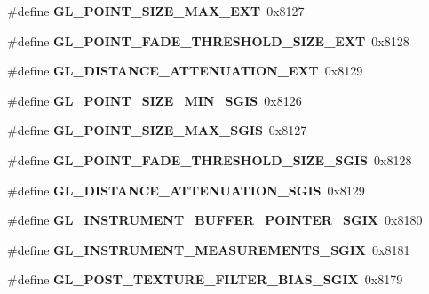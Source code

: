 \begin{DoxyCompactItemize}
\item 
\#define {\bfseries G\+L\+\_\+\+P\+O\+I\+N\+T\+\_\+\+S\+I\+Z\+E\+\_\+\+M\+A\+X\+\_\+\+E\+X\+T}~0x8127\label{_s_d_l__opengl_8h_a8436839348d23154e3869c6aeffbc7af}

\item 
\#define {\bfseries G\+L\+\_\+\+P\+O\+I\+N\+T\+\_\+\+F\+A\+D\+E\+\_\+\+T\+H\+R\+E\+S\+H\+O\+L\+D\+\_\+\+S\+I\+Z\+E\+\_\+\+E\+X\+T}~0x8128\label{_s_d_l__opengl_8h_a20802b84f5a710f59572b85b834d7e06}

\item 
\#define {\bfseries G\+L\+\_\+\+D\+I\+S\+T\+A\+N\+C\+E\+\_\+\+A\+T\+T\+E\+N\+U\+A\+T\+I\+O\+N\+\_\+\+E\+X\+T}~0x8129\label{_s_d_l__opengl_8h_ab4f79e552bfa98366ff4977cbc9304a4}

\item 
\#define {\bfseries G\+L\+\_\+\+P\+O\+I\+N\+T\+\_\+\+S\+I\+Z\+E\+\_\+\+M\+I\+N\+\_\+\+S\+G\+I\+S}~0x8126\label{_s_d_l__opengl_8h_a168c6e44294003b78965a6f0b9417d69}

\item 
\#define {\bfseries G\+L\+\_\+\+P\+O\+I\+N\+T\+\_\+\+S\+I\+Z\+E\+\_\+\+M\+A\+X\+\_\+\+S\+G\+I\+S}~0x8127\label{_s_d_l__opengl_8h_a15487da0f06c6715e5b98a1341ae0ce0}

\item 
\#define {\bfseries G\+L\+\_\+\+P\+O\+I\+N\+T\+\_\+\+F\+A\+D\+E\+\_\+\+T\+H\+R\+E\+S\+H\+O\+L\+D\+\_\+\+S\+I\+Z\+E\+\_\+\+S\+G\+I\+S}~0x8128\label{_s_d_l__opengl_8h_a06ce158d471f57cd4a86b08f6b54d8b1}

\item 
\#define {\bfseries G\+L\+\_\+\+D\+I\+S\+T\+A\+N\+C\+E\+\_\+\+A\+T\+T\+E\+N\+U\+A\+T\+I\+O\+N\+\_\+\+S\+G\+I\+S}~0x8129\label{_s_d_l__opengl_8h_a019f70d7665ba490146d48ea2c72e86b}

\item 
\#define {\bfseries G\+L\+\_\+\+I\+N\+S\+T\+R\+U\+M\+E\+N\+T\+\_\+\+B\+U\+F\+F\+E\+R\+\_\+\+P\+O\+I\+N\+T\+E\+R\+\_\+\+S\+G\+I\+X}~0x8180\label{_s_d_l__opengl_8h_a78948be95eb3e5d4e27413bea2dcf223}

\item 
\#define {\bfseries G\+L\+\_\+\+I\+N\+S\+T\+R\+U\+M\+E\+N\+T\+\_\+\+M\+E\+A\+S\+U\+R\+E\+M\+E\+N\+T\+S\+\_\+\+S\+G\+I\+X}~0x8181\label{_s_d_l__opengl_8h_a2f757e20804286a64aa6e5da4d2f6ec3}

\item 
\#define {\bfseries G\+L\+\_\+\+P\+O\+S\+T\+\_\+\+T\+E\+X\+T\+U\+R\+E\+\_\+\+F\+I\+L\+T\+E\+R\+\_\+\+B\+I\+A\+S\+\_\+\+S\+G\+I\+X}~0x8179\label{_s_d_l__opengl_8h_a9676bdf3ba87e85a5476de1f2910fa6a}


\end{DoxyCompactItemize}
